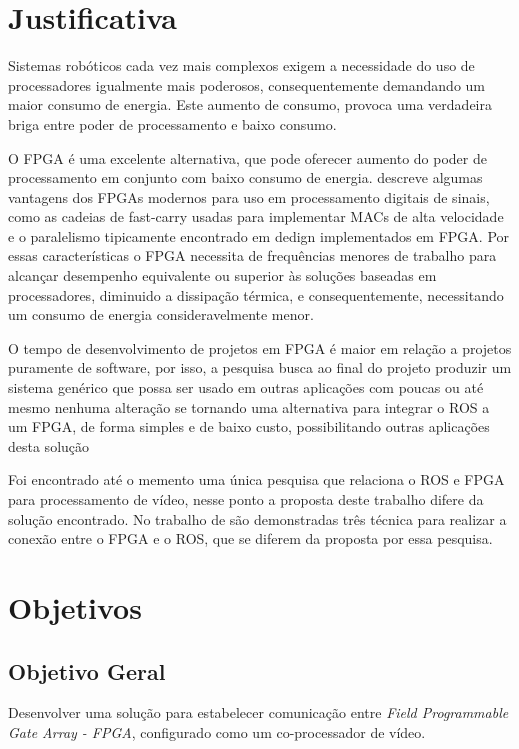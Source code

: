 \section{Justificativa}

Sistemas robóticos cada vez mais complexos exigem a necessidade do uso de processadores igualmente mais poderosos, consequentemente demandando um maior consumo de energia. Este aumento de consumo, provoca uma verdadeira briga entre poder de processamento e baixo consumo.

O FPGA é uma excelente alternativa, que pode oferecer aumento do poder de processamento em conjunto com baixo consumo de energia.  descreve algumas vantagens dos FPGAs modernos para uso em processamento digitais de sinais, como as cadeias de fast-carry usadas para implementar MACs de alta velocidade e o paralelismo tipicamente encontrado em dedign implementados em FPGA\@. Por essas características o FPGA necessita de frequências menores de trabalho para alcançar desempenho equivalente ou superior às soluções baseadas em processadores, diminuido a dissipação térmica, e consequentemente, necessitando um consumo de energia consideravelmente menor.

O tempo de desenvolvimento de projetos em FPGA é maior em relação a projetos puramente de software, por isso, a pesquisa busca ao final do projeto produzir um sistema genérico que possa ser usado em outras aplicações com poucas ou até mesmo nenhuma alteração se tornando uma alternativa para integrar o ROS a um FPGA, de forma simples e de baixo custo, possibilitando outras aplicações desta solução

Foi encontrado até o memento uma única pesquisa que relaciona o ROS e FPGA para  processamento de vídeo, nesse ponto a proposta deste trabalho difere da solução encontrado. No trabalho de  são demonstradas três técnica para realizar a conexão entre o FPGA e o ROS, que se diferem da proposta por essa pesquisa. 


\section{Objetivos}

\subsection{Objetivo Geral}

Desenvolver uma solução para estabelecer comunicação entre \textit{Field Programmable Gate Array - FPGA}, 
configurado como um co-processador de vídeo.

